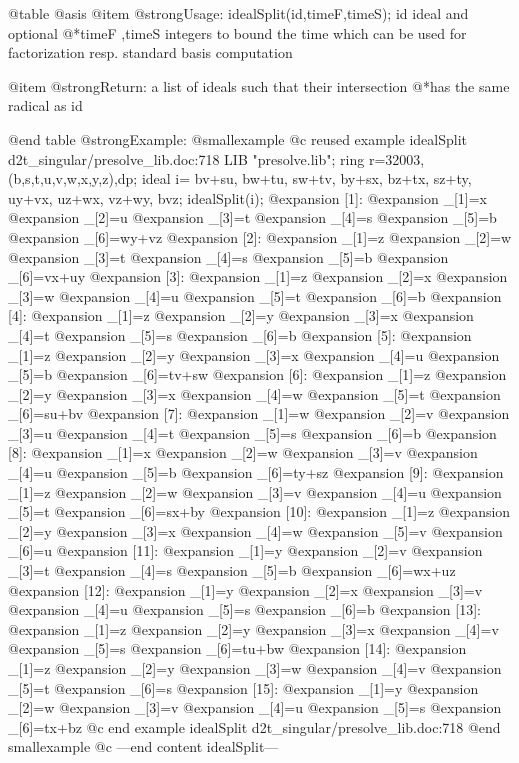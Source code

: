 @table @asis
@item @strong{Usage:}
idealSplit(id,timeF,timeS); id ideal and optional
@*timeF ,timeS integers to bound the time which can be used
for factorization resp. standard basis computation

@item @strong{Return:}
a list of ideals such that their intersection
@*has the same radical as id

@end table
@strong{Example:}
@smallexample
@c reused example idealSplit d2t_singular/presolve_lib.doc:718 
LIB "presolve.lib";
ring r=32003,(b,s,t,u,v,w,x,y,z),dp;
ideal i=
bv+su,
bw+tu,
sw+tv,
by+sx,
bz+tx,
sz+ty,
uy+vx,
uz+wx,
vz+wy,
bvz;
idealSplit(i);
@expansion{} [1]:
@expansion{}    _[1]=x
@expansion{}    _[2]=u
@expansion{}    _[3]=t
@expansion{}    _[4]=s
@expansion{}    _[5]=b
@expansion{}    _[6]=wy+vz
@expansion{} [2]:
@expansion{}    _[1]=z
@expansion{}    _[2]=w
@expansion{}    _[3]=t
@expansion{}    _[4]=s
@expansion{}    _[5]=b
@expansion{}    _[6]=vx+uy
@expansion{} [3]:
@expansion{}    _[1]=z
@expansion{}    _[2]=x
@expansion{}    _[3]=w
@expansion{}    _[4]=u
@expansion{}    _[5]=t
@expansion{}    _[6]=b
@expansion{} [4]:
@expansion{}    _[1]=z
@expansion{}    _[2]=y
@expansion{}    _[3]=x
@expansion{}    _[4]=t
@expansion{}    _[5]=s
@expansion{}    _[6]=b
@expansion{} [5]:
@expansion{}    _[1]=z
@expansion{}    _[2]=y
@expansion{}    _[3]=x
@expansion{}    _[4]=u
@expansion{}    _[5]=b
@expansion{}    _[6]=tv+sw
@expansion{} [6]:
@expansion{}    _[1]=z
@expansion{}    _[2]=y
@expansion{}    _[3]=x
@expansion{}    _[4]=w
@expansion{}    _[5]=t
@expansion{}    _[6]=su+bv
@expansion{} [7]:
@expansion{}    _[1]=w
@expansion{}    _[2]=v
@expansion{}    _[3]=u
@expansion{}    _[4]=t
@expansion{}    _[5]=s
@expansion{}    _[6]=b
@expansion{} [8]:
@expansion{}    _[1]=x
@expansion{}    _[2]=w
@expansion{}    _[3]=v
@expansion{}    _[4]=u
@expansion{}    _[5]=b
@expansion{}    _[6]=ty+sz
@expansion{} [9]:
@expansion{}    _[1]=z
@expansion{}    _[2]=w
@expansion{}    _[3]=v
@expansion{}    _[4]=u
@expansion{}    _[5]=t
@expansion{}    _[6]=sx+by
@expansion{} [10]:
@expansion{}    _[1]=z
@expansion{}    _[2]=y
@expansion{}    _[3]=x
@expansion{}    _[4]=w
@expansion{}    _[5]=v
@expansion{}    _[6]=u
@expansion{} [11]:
@expansion{}    _[1]=y
@expansion{}    _[2]=v
@expansion{}    _[3]=t
@expansion{}    _[4]=s
@expansion{}    _[5]=b
@expansion{}    _[6]=wx+uz
@expansion{} [12]:
@expansion{}    _[1]=y
@expansion{}    _[2]=x
@expansion{}    _[3]=v
@expansion{}    _[4]=u
@expansion{}    _[5]=s
@expansion{}    _[6]=b
@expansion{} [13]:
@expansion{}    _[1]=z
@expansion{}    _[2]=y
@expansion{}    _[3]=x
@expansion{}    _[4]=v
@expansion{}    _[5]=s
@expansion{}    _[6]=tu+bw
@expansion{} [14]:
@expansion{}    _[1]=z
@expansion{}    _[2]=y
@expansion{}    _[3]=w
@expansion{}    _[4]=v
@expansion{}    _[5]=t
@expansion{}    _[6]=s
@expansion{} [15]:
@expansion{}    _[1]=y
@expansion{}    _[2]=w
@expansion{}    _[3]=v
@expansion{}    _[4]=u
@expansion{}    _[5]=s
@expansion{}    _[6]=tx+bz
@c end example idealSplit d2t_singular/presolve_lib.doc:718
@end smallexample
@c ---end content idealSplit---

